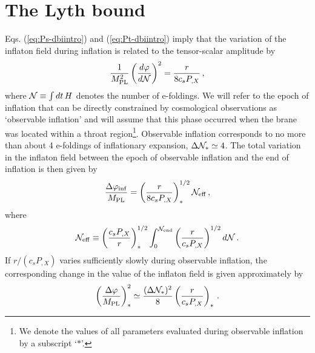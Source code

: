 \section{The Lyth bound}
\label{sec:lyth-dbiintro}

Eqs. (\ref{eq:Ps-dbiintro}) and (\ref{eq:Pt-dbiintro}) imply 
that the variation of the inflaton field during inflation  
is related to the tensor-scalar amplitude by \cite{lyth,bmpaper}
% 
\begin{equation}
\label{eq:genlyth-dbiintro}
\frac{1}{M_{\mathrm{PL}}^2}
\left( \frac{d \varphi}{d \cal{N}} \right)^2 = \frac{r}{8 c_s P_{,X}} \,,
\end{equation}
% 
where ${\cal{N}} \equiv \int dt \, H$ denotes the number of e-foldings.
We will refer to the epoch of inflation that can be directly 
constrained by cosmological observations as 
`observable inflation' and will assume that this phase 
occurred when the brane was located within a 
throat region\footnote{We denote the values of all parameters 
evaluated during observable inflation by a subscript 
`$*$'.}. Observable inflation corresponds to no more than about 4 e-foldings  
of inflationary expansion, $\Delta {\cal{N}}_* \simeq 4$. 
The total variation in the inflaton field between the epoch of observable 
inflation and the end of inflation is then given by
% 
\begin{equation}
\label{eq:totalfield-dbiintro}
\frac{\Delta \varphi_{\rm inf}}{M_{\mathrm{PL}}} = 
\left( \frac{r}{8c_sP_{,X}} \right)_*^{1/2} {\cal{N}}_{\rm eff} \,,
\end{equation}
% 
where
% 
\begin{equation}
\label{eq:Neff-dbiintro}
{\cal{N}}_{\rm eff} \equiv \left( \frac{c_sP_{,X}}{r}\right)_*^{1/2}
\int_0^{{\cal{N}}_{\rm end}}  
\left( \frac{r}{c_sP_{,X}} \right)^{1/2} d {\cal{N}} \,.
\end{equation}
% 
If $r/(c_s P_{,X})$ varies 
sufficiently slowly during observable inflation, 
the corresponding change in the value of the inflaton  
field is given approximately by \cite{lyth,bmpaper}
% 
\begin{equation}
\label{eq:approxlyth-dbiintro}
\left( \frac{\Delta \varphi}{M_{\mathrm{PL}}} \right)_*^2 \simeq 
\frac{(\Delta {\cal{N}}_*)^2}{8} \left( \frac{r}{c_sP_{,X}} \right)_* \,.
\end{equation}
% 

